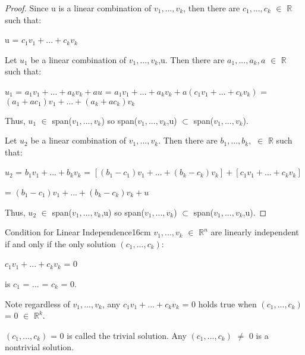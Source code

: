     \begin{proof}
        Since u is a linear combination of $v_1,...,v_k$, then there are
        $c_1,...,c_k$ $\in$ $\mathbb{R}$ such that:

        \hspace{0.5cm}
        u = $c_1v_1 + ... + c_kv_k$

        Let $u_1$ be a linear combination of $v_1,...,v_k$,u.
        Then there are $a_1,...,a_k,a$ $\in$ $\mathbb{R}$ such that:

        \hspace{0.5cm}
        $u_1$ = $a_1v_1 + ... + a_kv_k + au$
        = $a_1v_1 + ... + a_kv_k + a(c_1v_1 + ... + c_kv_k)$
        = $(a_1+ac_1)v_1 + ... + (a_k+ac_k)v_k$

        Thus, $u_1$ $\in$ span($v_1,...,v_k$)
        so span($v_1,...,v_k$,u) $\subset$ span($v_1,...,v_k$).

        Let $u_2$ be a linear combination of $v_1,...,v_k$.
        Then there are $b_1,...,b_k,$ $\in$ $\mathbb{R}$ such that:

        \hspace{0.5cm}
        $u_2$ = $b_1v_1 + ... + b_kv_k$
        = $[(b_1-c_1)v_1 + ... + (b_k-c_k)v_k] + [c_1v_1 + ... + c_kv_k]$

        \hspace{1.05cm}
        = $(b_1-c_1)v_1 + ... + (b_k-c_k)v_k + u$

        Thus, $u_2$ $\in$ span($v_1,...,v_k$,u)
        so span($v_1,...,v_k$) $\subset$ span($v_1,...,v_k$,u).
    \end{proof}

    \vspace{0.5cm}



    \begin{wtheorem}{Condition for Linear Independence}{16cm}
        $v_1,...,v_k$ $\in$ $\mathbb{R}^n$ are linearly independent
        if and only if the only solution $(c_1,...,c_k)$:

        \hspace{0.5cm}
        $c_1v_1 + ... + c_kv_k$ = 0

        is $c_1$ = ... = $c_k$ = 0.

        Note regardless of $v_1,...,v_k$, any $c_1v_1 + ... + c_kv_k$ = 0
        holds true when $(c_1,...,c_k)$ = 0 $\in$ $\mathbb{R}^k$.
        
        $(c_1,...,c_k)$ = 0 is called the {\color{lblue} trivial solution}.
        Any $(c_1,...,c_k)$ $\not =$ 0 is a {\color{lblue} nontrivial solution}.
    \end{wtheorem}

